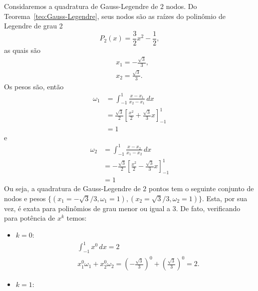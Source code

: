 \begin{ex}
  Considaremos a quadratura de Gauss-Legendre de $2$ nodos. Do Teorema~\ref{teo:Gauss-Legendre}, seus nodos são as raízes do polinômio de Legendre de grau 2
  \begin{equation}
    P_2(x) = \frac{3}{2}x^2 - \frac{1}{2},
  \end{equation}
as quais são
\begin{subequations}
  \begin{align}
    &x_1 = -\frac{\sqrt{3}}{3},\\
    &x_2 =\frac{\sqrt{3}}{3}.
  \end{align}
\end{subequations}
Os pesos são, então
\begin{subequations}
  \begin{align}
    \omega_1 &= \int_{-1}^1 \frac{x-x_1}{x_2-x_1}\,dx \\
             &= \frac{\sqrt{3}}{2}\left[\frac{x^2}{2}+\frac{\sqrt{3}}{3}x\right]_{-1}^1\\
             &= 1
  \end{align}
\end{subequations}
e
\begin{subequations}
  \begin{align}
    \omega_2 &= \int_{-1}^1 \frac{x-x_2}{x_1-x_2}\,dx \\
             &= -\frac{\sqrt{3}}{2}\left[\frac{x^2}{2}-\frac{\sqrt{3}}{3}x\right]_{-1}^1\\
             &= 1
  \end{align}
\end{subequations}
Ou seja, a quadratura de Gauss-Legendre de $2$ pontos tem o seguinte conjunto de nodos e pesos $\{(x_1=-\sqrt{3}/3, \omega_1=1), (x_2=\sqrt{3}/3, \omega_2=1)\}$. Esta, por sua vez, é exata para polinômios de grau menor ou igual a $3$. De fato, verificando para potência de $x^k$ temos:
\begin{itemize}
\item $k=0$:
  \begin{subequations}
    \begin{align}
      &\int_{-1}^1 x^0\,dx = 2\\
      &x_1^0\omega_1 + x_2^0\omega_2 = \left(-\frac{\sqrt{3}}{3}\right)^0 + \left(\frac{\sqrt{3}}{3}\right)^0 = 2.
    \end{align}
\end{subequations}
\item $k=1$:

\end{itemize}
\end{ex}
